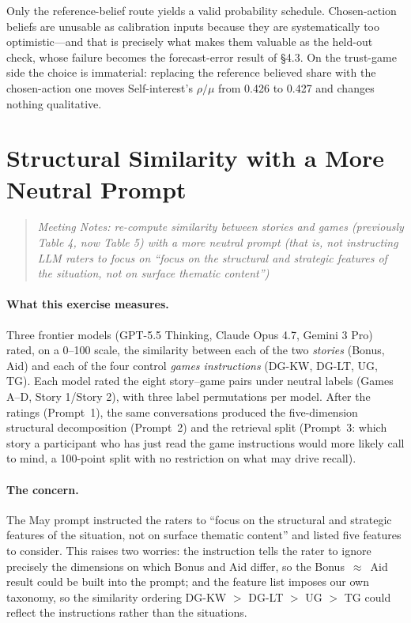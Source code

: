 \documentclass[11pt]{article}
\begin{document}
Only the reference-belief route yields a valid probability schedule. Chosen-action
beliefs are unusable as calibration inputs because they are systematically too
optimistic---and that is precisely what makes them valuable as the held-out check, whose
failure becomes the forecast-error result of \S4.3. On the trust-game side the choice is
immaterial: replacing the reference believed share with the chosen-action one moves
Self-interest's $\rho/\mu$ from 0.426 to 0.427 and changes nothing qualitative. 

\section{Structural Similarity with a More Neutral Prompt}

\begin{quote}\itshape
Meeting Notes: re-compute similarity between stories and games (previously Table 4, now Table 5) with a more neutral prompt (that is, not instructing LLM raters to focus on ``focus on the structural and strategic features of the situation, not on surface thematic content'')
\end{quote}

\paragraph{What this exercise measures.} Three frontier models (GPT-5.5 Thinking,
Claude Opus 4.7, Gemini 3 Pro) rated, on a 0--100 scale, the similarity between each of
the two \emph{stories} (Bonus, Aid) and each of the four control \emph{games instructions} (DG-KW, DG-LT,
UG, TG). Each model rated the eight story--game pairs under neutral labels
(Games A--D, Story 1/Story 2), with three label permutations per model. After the ratings (Prompt~1), the same conversations produced the five-dimension structural decomposition (Prompt~2) and the retrieval split (Prompt~3:
which story a participant who has just read the game instructions would more likely
call to mind, a 100-point split with no restriction on what may drive recall).

\paragraph{The concern.} The May prompt instructed the raters to ``focus on the
structural and strategic features of the situation, not on surface thematic content''
and listed five features to consider. This raises two worries: the instruction tells the
rater to ignore precisely the dimensions on which Bonus and Aid differ, so the
Bonus~$\approx$~Aid result could be built into the prompt; and the feature list imposes
our own taxonomy, so the similarity ordering DG-KW $>$ DG-LT $>$ UG $>$ TG could
reflect the instructions rather than the situations.
\end{document}
